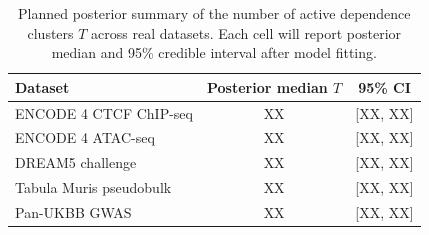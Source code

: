 \begin{table}[H]
\centering
\caption{Planned real-data discovery counts at IDR $\leq0.05$ across the five real datasets. Each cell will report the number of features declared reproducible after the companion experiments are run. Placeholder ``XX,XXX'' cells are not observed results.}
\label{tab:real-disc}
\scriptsize
{}
\end{table}

\begin{table}[H]
\centering
\caption{Planned posterior summary of the number of active dependence clusters $T$ across real datasets. Each cell will report posterior median and 95\% credible interval after model fitting.}
\label{tab:real-clusters}
\small
\begin{tabularx}{\textwidth}{Ycc}
\toprule
Dataset & Posterior median $T$ & 95\% CI \\
\midrule
ENCODE 4 CTCF ChIP-seq & XX & [XX, XX] \\
ENCODE 4 ATAC-seq & XX & [XX, XX] \\
DREAM5 challenge & XX & [XX, XX] \\
Tabula Muris pseudobulk & XX & [XX, XX] \\
Pan-UKBB GWAS & XX & [XX, XX] \\
\bottomrule
\end{tabularx}
\end{table}

